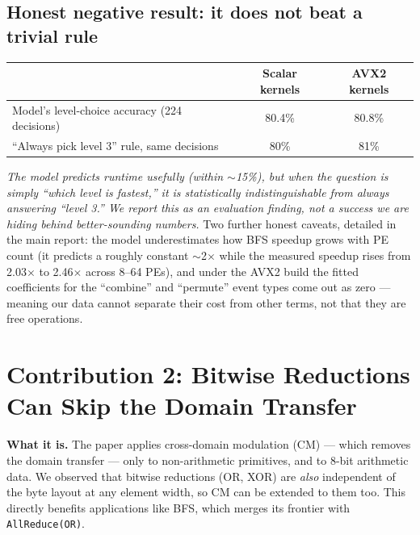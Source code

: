 \documentclass[11pt]{article}
\begin{document}
\subsection{Honest negative result: it does not beat a trivial rule}
\begin{center}\small
\begin{tabular}{@{}lcc@{}}\toprule
 & Scalar kernels & AVX2 kernels \\\midrule
Model's level-choice accuracy (224 decisions) & 80.4\% & 80.8\% \\
``Always pick level 3'' rule, same decisions & 80\% & 81\% \\
\bottomrule
\end{tabular}
\end{center}
\noindent\textit{The model predicts \emph{runtime} usefully (within $\sim$15\%), but when the question is simply ``which level is fastest,'' it is statistically indistinguishable from always answering ``level 3.'' We report this as an evaluation finding, not a success we are hiding behind better-sounding numbers.} Two further honest caveats, detailed in the main report: the model underestimates how BFS speedup grows with PE count (it predicts a roughly constant $\sim$2$\times$ while the measured speedup rises from 2.03$\times$ to 2.46$\times$ across 8--64 PEs), and under the AVX2 build the fitted coefficients for the ``combine'' and ``permute'' event types come out as zero --- meaning our data cannot separate their cost from other terms, not that they are free operations.

\section{Contribution 2: Bitwise Reductions Can Skip the Domain Transfer}
\textbf{What it is.} The paper applies cross-domain modulation (CM) --- which removes the domain transfer --- only to non-arithmetic primitives, and to 8-bit arithmetic data. We observed that bitwise reductions (OR, XOR) are \emph{also} independent of the byte layout at any element width, so CM can be extended to them too. This directly benefits applications like BFS, which merges its frontier with \texttt{AllReduce(OR)}.
\end{document}

